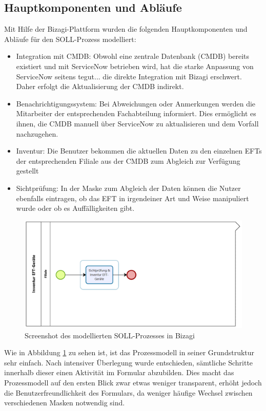 \documentclass[12pt, a4paper]{article}
\begin{document}
\subsection{Hauptkomponenten und Abläufe}

Mit Hilfe der Bizagi-Plattform wurden die folgenden Hauptkomponenten und Abläufe für den SOLL-Prozess modelliert:

\begin{itemize}
\item Integration mit CMDB: Obwohl eine zentrale Datenbank (CMDB) bereits existiert und mit ServiceNow betrieben wird, hat die starke Anpassung von ServiceNow seitens tegut... 
die direkte Integration mit Bizagi erschwert. Daher erfolgt die Aktualisierung der CMDB indirekt.
\item Benachrichtigungssystem: Bei Abweichungen oder Anmerkungen werden die Mitarbeiter der entsprechenden Fachabteilung informiert. Dies ermöglicht es ihnen, die 
CMDB manuell über ServiceNow zu aktualisieren und dem Vorfall nachzugehen.
\item Inventur: Die Benutzer bekommen die aktuellen Daten zu den einzelnen EFTs der entsprechenden Filiale aus der CMDB zum Abgleich zur Verfügung gestellt
\item Sichtprüfung: In der Maske zum Abgleich der Daten können die Nutzer ebenfalls eintragen, ob das EFT in irgendeiner Art und Weise manipuliert wurde oder ob es Auffälligkeiten gibt. 
\end{itemize}

\begin{figure}
    \centering
    \includegraphics[width=\textwidth]{images/process.png}
    \caption{Screenshot des modellierten SOLL-Prozesses in Bizagi}
    \label{fig:soll_process}
\end{figure}

Wie in Abbildung \ref{fig:soll_process} zu sehen ist, ist das Prozessmodell in seiner Grundstruktur sehr einfach. Nach intensiver Überlegung wurde entschieden, 
sämtliche Schritte innerhalb dieser einen Aktivität im Formular abzubilden. Dies macht das Prozessmodell auf den ersten Blick zwar etwas weniger transparent, erhöht 
jedoch die Benutzerfreundlichkeit des Formulars, da weniger häufige Wechsel zwischen verschiedenen Masken notwendig sind.
\end{document}
